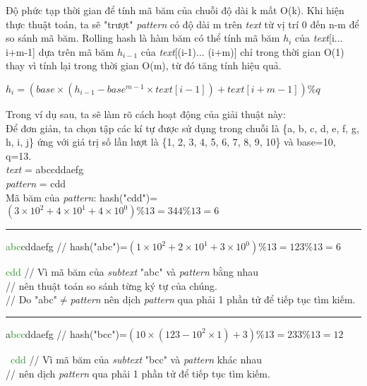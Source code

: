 \documentclass[a4paper,11pt]{article}
\begin{document}
			Độ phức tạp thời gian để tính mã băm của chuỗi độ dài k mất O(k). Khi hiện thực thuật toán, ta sẽ "trượt" \textit{pattern} có độ dài m trên \textit{text} từ vị trí 0 đến n-m để so sánh mã băm. Rolling hash là hàm băm có thể tính mã băm $h_i$ của \textit{text}[i... i+m-1] dựa trên mã băm $h_{i-1}$ của \textit{text}[(i-1)... (i+m)] chỉ trong thời gian O(1) thay vì tính lại trong thời gian O(m), từ đó tăng tính hiệu quả.

			$h_i=(base\times(h_{i-1}-base^{m-1}\times\textit{text}[i-1])+\textit{text}[i+m-1]) \% q$

			Trong ví dụ sau, ta sẽ làm rõ cách hoạt động của giải thuật này:\\
			Để đơn giản, ta chọn tập các kí tự được sử dụng trong chuỗi là \{a, b, c, d, e, f, g, h, i, j\} ứng với giá trị số lần lượt là \{1, 2, 3, 4, 5, 6, 7, 8, 9, 10\} và base=10, q=13.\\
			\textit{text} \hspace*{6mm}= abccddaefg\\
			\textit{pattern} \hspace*{0.3mm}= cdd\\
			Mã băm của \textit{pattern}: hash("cdd")=$(3\times10^2+4\times10^1+4\times10^0) \% 13=344 \% 13=6$
			
			\pagebreak
			\vspace*{4mm}
			\hrule
			\textcolor{ForestGreen}{abc}cddaefg \hspace*{0.6cm} // hash("abc")=$(1\times10^2+2\times10^1+3\times10^0) \% 13=123 \% 13=6$

			\textcolor{ForestGreen}{cdd} \hspace*{1.8cm} // Vì mã băm của \textit{subtext} "abc" và \textit{pattern} bằng nhau \\
		\hspace*{2.5cm} // nên thuật toán so sánh từng ký tự của chúng.\\
		\hspace*{2.5cm} // Do "abc"$\neq$\textit{pattern} nên dịch \textit{pattern} qua phải 1 phần tử để tiếp tục tìm kiếm.

			\vspace*{2mm}
			\hrule
			a\textcolor{ForestGreen}{bcc}ddaefg \hspace*{0.6cm} // hash("bcc")=$(10\times(123-10^2\times1)+3)\%13=233\%13=12$
			
			\textcolor{white}{a}\textcolor{ForestGreen}{cdd} \hspace*{1.6cm} // Vì mã băm của \textit{subtext} "bcc" và \textit{pattern} khác nhau \\
		\hspace*{2.5cm} // nên dịch \textit{pattern} qua phải 1 phần tử để tiếp tục tìm kiếm.
\end{document}

